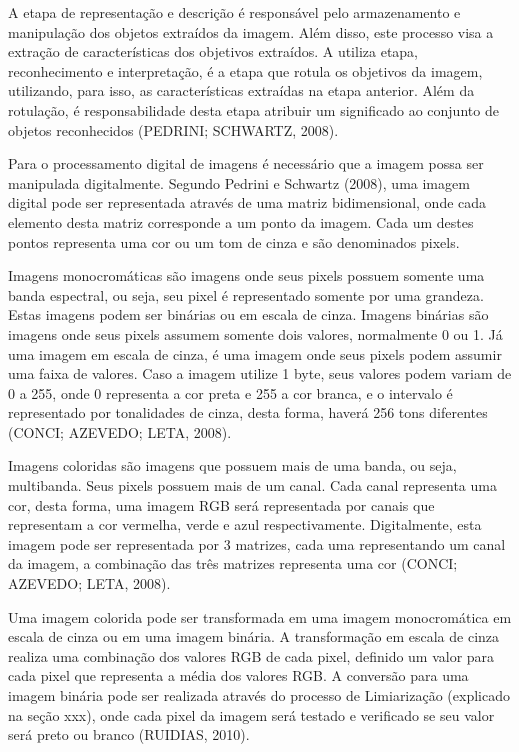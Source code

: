 \documentclass[
	12pt,				%
	oneside,			%
	a4paper,			%
	english,			%
	french,				%
	spanish,			%
	brazil,				%
	]{abntex2}
\begin{document}
A etapa de representação e descrição é responsável  pelo armazenamento e manipulação dos objetos extraídos da imagem. Além disso, este processo visa a extração de características dos objetivos extraídos. A utiliza etapa, reconhecimento e interpretação, é a etapa que rotula os objetivos da imagem, utilizando, para isso, as características extraídas na etapa anterior. Além da rotulação, é responsabilidade desta etapa atribuir um significado ao conjunto de objetos reconhecidos (PEDRINI; SCHWARTZ, 2008). 

Para o processamento digital de imagens é necessário que a imagem possa ser manipulada digitalmente. Segundo Pedrini e Schwartz (2008), uma imagem digital pode ser representada através de uma matriz bidimensional, onde cada elemento desta matriz corresponde a um ponto da imagem. Cada um destes pontos representa uma cor ou um tom de cinza e são denominados pixels. 

Imagens monocromáticas são imagens onde seus pixels possuem somente uma banda espectral, ou seja, seu pixel é representado somente por uma grandeza. Estas imagens podem ser binárias ou em escala de cinza. Imagens binárias são imagens onde seus pixels assumem somente dois valores, normalmente 0 ou 1. Já uma imagem em escala de cinza, é uma imagem onde seus pixels podem assumir uma faixa de valores. Caso a imagem utilize 1 byte, seus valores podem variam de 0 a 255, onde 0 representa a cor preta e 255 a cor branca, e o intervalo é representado por tonalidades de cinza, desta forma, haverá 256 tons diferentes (CONCI; AZEVEDO; LETA, 2008).

Imagens coloridas são imagens que possuem mais de uma banda, ou seja, multibanda. Seus pixels possuem mais de um canal. Cada canal representa uma cor, desta forma, uma imagem RGB será representada por canais que representam a cor vermelha, verde e azul respectivamente. Digitalmente, esta imagem pode ser representada por 3 matrizes, cada uma representando um canal da imagem, a combinação das três matrizes representa uma cor (CONCI; AZEVEDO; LETA, 2008).

Uma imagem colorida pode ser transformada em uma imagem monocromática em escala de cinza ou em uma imagem binária. A transformação em escala de cinza realiza uma combinação dos valores RGB de cada pixel, definido um valor para cada pixel que representa a média dos valores RGB. A conversão para uma imagem binária pode ser realizada através do processo de Limiarização (explicado na seção xxx), onde cada pixel da imagem será testado e verificado se seu valor será preto ou branco (RUIDIAS, 2010).
\end{document}
